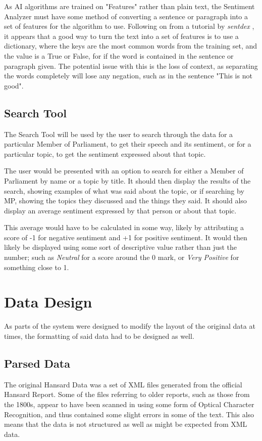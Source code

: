 As AI algorithms are trained on "Features" rather than plain text, the Sentiment Analyzer must have some method of converting a sentence or paragraph into a set of features for the algorithm to use. Following on from a tutorial by \emph{sentdex} \cite{NLTKYoutubePlaylist}, it appears that a good way to turn the text into a set of features is to use a dictionary, where the keys are the most common words from the training set, and the value is a True or False, for if the word is contained in the sentence or paragraph given. The potential issue with this is the loss of context, as separating the words completely will lose any negation, such as in the sentence "This is not good".

\subsection{Search Tool}
\label{sec:des_search_tool}
The Search Tool will be used by the user to search through the data for a particular Member of Parliament, to get their speech and its sentiment, or for a particular topic, to get the sentiment expressed about that topic.

The user would be presented with an option to search for either a Member of Parliament by name or a topic by title. It should then display the results of the search, showing examples of what was said about the topic, or if searching by MP, showing the topics they discussed and the things they said. It should also display an average sentiment expressed by that person or about that topic.

This average would have to be calculated in some way, likely by attributing a score of -1 for negative sentiment and +1 for positive sentiment. It would then likely be displayed using some sort of descriptive value rather than just the number; such as \emph{Neutral} for a score around the 0 mark, or \emph{Very Positive} for something close to 1.

\section{Data Design}
\label{sec:des_data}
As parts of the system were designed to modify the layout of the original data at times, the formatting of said data had to be designed as well.

\subsection{Parsed Data}
\label{sec:des_parsed_data}
The original Hansard Data was a set of XML files generated from the official Hansard Report. Some of the files referring to older reports, such as those from the 1800s, appear to have been scanned in using some form of Optical Character Recognition, and thus contained some slight errors in some of the text. This also means that the data is not structured as well as might be expected from XML data.

